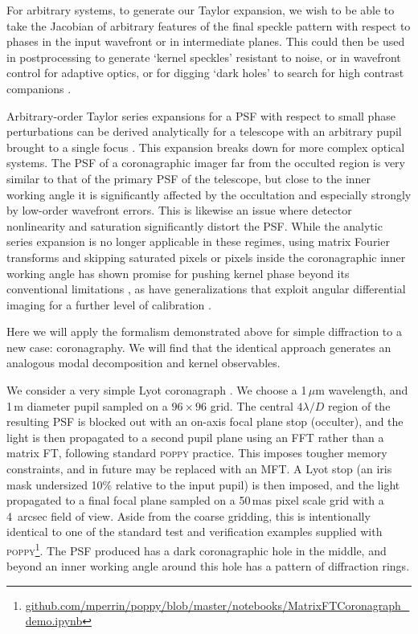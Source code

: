 \documentclass[modern]{aastex63}
\begin{document}
For arbitrary systems, to generate our Taylor expansion, we wish to be able to take the Jacobian of arbitrary features of the final speckle pattern with respect to phases in the input wavefront or in intermediate planes. This could then be used in postprocessing to generate `kernel speckles' resistant to noise, or in wavefront control for adaptive optics, or for digging `dark holes' to search for high contrast companions \citep{malbet95}.

Arbitrary-order Taylor series expansions for a PSF with respect to small phase perturbations can be derived analytically for a telescope with an arbitrary pupil brought to a single focus \citep{bloemhof01,anand02,perrin03}. This expansion breaks down for more complex optical systems. The PSF of a coronagraphic imager far from the occulted region is very similar to that of the primary PSF of the telescope, but close to the inner working angle it is significantly affected by the occultation and especially strongly by low-order wavefront errors. This is likewise an issue where detector nonlinearity and saturation significantly distort the PSF. While the analytic series expansion is no longer applicable in these regimes, using matrix Fourier transforms and skipping saturated pixels or pixels inside the coronagraphic inner working angle has shown promise for pushing kernel phase beyond its conventional limitations \citep{laugier19b}, as have generalizations that exploit angular differential imaging for a further level of calibration \citep{laugier20}.

Here we will apply the formalism demonstrated above for simple diffraction to a new case: coronagraphy. We will find that the identical approach generates an analogous modal decomposition and kernel observables.

We consider a very simple Lyot coronagraph \citep{lyot30}. We choose a 1\,$\mu$m wavelength, and 1\,m diameter pupil sampled on a $96\times96$ grid. The central $4 \lambda/D$ region of the resulting PSF is blocked out with an on-axis focal plane stop (occulter), and the light is then propagated to a second pupil plane using an FFT rather than a matrix FT, following standard \textsc{poppy} practice. This imposes tougher memory constraints, and in future may be replaced with an MFT. A Lyot stop (an iris mask undersized 10\% relative to the input pupil) is then imposed, and the light propagated to a final focal plane sampled on a 50\,mas pixel scale grid with a 4~arcsec field of view. Aside from the coarse gridding, this is intentionally identical to one of the standard test and verification examples supplied with \textsc{poppy}\footnote{\href{https://github.com/mperrin/poppy/blob/master/notebooks/MatrixFTCoronagraph_demo.ipynb}{github.com/mperrin/poppy/blob/master/notebooks/MatrixFTCoronagraph\_demo.ipynb}}. The PSF produced has a dark coronagraphic hole in the middle, and beyond an inner working angle around this hole has a pattern of diffraction rings.
\end{document}
